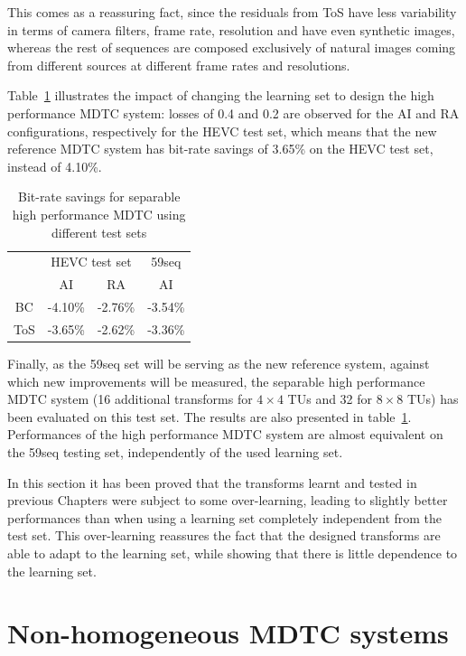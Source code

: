 \documentclass[11pt,a4paper,openright,twoside]{book}
\numberwithin{equation}{section} %
\numberwithin{figure}{section} %
\numberwithin{table}{section} %
\begin{document}
This comes as a reassuring fact, since the residuals from ToS have less
variability in terms of camera filters, frame rate, resolution and have even
synthetic images, whereas the rest of sequences are composed exclusively of
natural images coming from different sources at different frame rates and
resolutions.

Table~\ref{tab:cross_bdrate_learn} illustrates the impact of changing the
learning set to design the high performance \ac{MDTC} system: losses of 0.4
and 0.2 are observed for the \ac{AI} and \ac{RA} configurations, respectively
for the \ac{HEVC} test set, which means that the new reference \ac{MDTC}
system has bit-rate savings of 3.65\% on the \ac{HEVC} test set, instead of
4.10\%.

\begin{table}[tb]
	\centering
	\small
	\begin{tabular}{c|cc|c}
		& \multicolumn{2}{c|}{\acs{HEVC} test set} & 59seq \\
		\diagbox{Learn}{Test}
		& \acs{AI} & \acs{RA} & \acs{AI} \\
		\hline\hline
		BC  & -4.10\% & -2.76\% & -3.54\% \\
		ToS & -3.65\% & -2.62\% & -3.36\% \\
	\end{tabular}
	\caption{Bit-rate savings for separable high performance \acs{MDTC} using
	different test sets}
	\label{tab:cross_bdrate_learn}
\end{table}

Finally, as the 59seq set will be serving as the new reference system, against
which new improvements will be measured, the separable high performance
\ac{MDTC} system (16 additional transforms for $4\times4$ \acp{TU} and 32 for
$8\times8$ \acp{TU}) has been evaluated on this test set.
The results are also presented in table~\ref{tab:cross_bdrate_learn}.
Performances of the high performance \ac{MDTC} system are almost equivalent on
the 59seq testing set, independently of the used learning set.

In this section it has been proved that the transforms learnt and tested in
previous Chapters were subject to some over-learning, leading to slightly
better performances than when using a learning set completely independent from
the test set.
This over-learning reassures the fact that the designed transforms are able to
adapt to the learning set, while showing that there is little dependence to
the learning set.

\section{Non-homogeneous \acs{MDTC} systems}
\label{sec:non_homogeneous_mdtc_systems}
\end{document}
